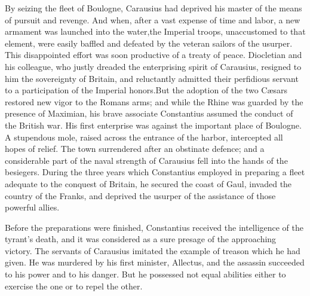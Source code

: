 By seizing the fleet of Boulogne, Carausius had deprived his
master of the means of pursuit and revenge. And when, after a
vast expense of time and labor, a new armament was launched into
the water,\footnotemark[29] the Imperial troops, unaccustomed to that element,
were easily baffled and defeated by the veteran sailors of the
usurper. This disappointed effort was soon productive of a treaty
of peace. Diocletian and his colleague, who justly dreaded the
enterprising spirit of Carausius, resigned to him the sovereignty
of Britain, and reluctantly admitted their perfidious servant to
a participation of the Imperial honors.\footnotemark[30] But the adoption of
the two Cæsars restored new vigor to the Romans arms; and while
the Rhine was guarded by the presence of Maximian, his brave
associate Constantius assumed the conduct of the British war. His
first enterprise was against the important place of Boulogne. A
stupendous mole, raised across the entrance of the harbor,
intercepted all hopes of relief. The town surrendered after an
obstinate defence; and a considerable part of the naval strength
of Carausius fell into the hands of the besiegers. During the
three years which Constantius employed in preparing a fleet
adequate to the conquest of Britain, he secured the coast of
Gaul, invaded the country of the Franks, and deprived the usurper
of the assistance of those powerful allies.



Before the preparations were finished, Constantius received the
intelligence of the tyrant’s death, and it was considered as a
sure presage of the approaching victory. The servants of
Carausius imitated the example of treason which he had given. He
was murdered by his first minister, Allectus, and the assassin
succeeded to his power and to his danger. But he possessed not
equal abilities either to exercise the one or to repel the other.

